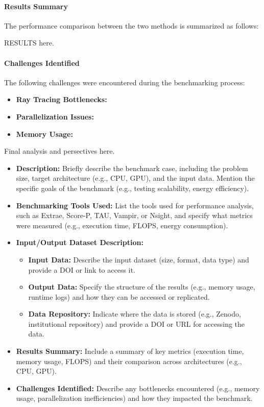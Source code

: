 \paragraph{Results Summary}
The performance comparison between the two methods is summarized as follows:

RESULTS here.

\paragraph{Challenges Identified}
The following challenges were encountered during the benchmarking process:
\begin{itemize}
    \item \textbf{Ray Tracing Bottlenecks:}
    \item \textbf{Parallelization Issues:}
    \item \textbf{Memory Usage:}
\end{itemize}

Final analysis and persectives here.

\begin{itemize}
    \item \textbf{Description:} Briefly describe the benchmark case, including the problem size, target architecture (e.g., CPU, GPU), and the input data. Mention the specific goals of the benchmark (e.g., testing scalability, energy efficiency).
    \item \textbf{Benchmarking Tools Used:} List the tools used for performance analysis, such as Extrae, Score-P, TAU, Vampir, or Nsight, and specify what metrics were measured (e.g., execution time, FLOPS, energy consumption).
    \item \textbf{Input/Output Dataset Description:}
        \begin{itemize}
            \item \textbf{Input Data:} Describe the input dataset (size, format, data type) and provide a DOI or link to access it.
            \item \textbf{Output Data:} Specify the structure of the results (e.g., memory usage, runtime logs) and how they can be accessed or replicated.
            \item \textbf{Data Repository:} Indicate where the data is stored (e.g., Zenodo, institutional repository) and provide a DOI or URL for accessing the data.
        \end{itemize}
    \item \textbf{Results Summary:} Include a summary of key metrics (execution time, memory usage, FLOPS) and their comparison across architectures (e.g., CPU, GPU).
    \item \textbf{Challenges Identified:} Describe any bottlenecks encountered (e.g., memory usage, parallelization inefficiencies) and how they impacted the benchmark.
\end{itemize}

